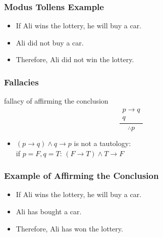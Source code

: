 \documentclass[dvipsnames]{beamer}
\begin{document}
\begin{frame}
  \frametitle{Modus Tollens Example}

  \begin{example}
    \begin{itemize}
      \item If Ali wins the lottery, he will buy a car.
      \item Ali did not buy a car.

      \pause
      \medskip
      \item Therefore, Ali did not win the lottery.
    \end{itemize}
  \end{example}
\end{frame}

\begin{frame}
  \frametitle{Fallacies}

  \begin{block}{fallacy of affirming the conclusion}
    \[
    \frac
      {
      \begin{array}{c}
        p \rightarrow q\\
        q
        \end{array}
      }
      {
        \therefore p
      }
    \]
  \end{block}

  \pause
  \begin{itemize}
    \item $(p \rightarrow q) \wedge q \rightarrow p$ is not a tautology:\\
      if $p=F,q=T$: $(F \rightarrow T) \wedge T \rightarrow F$
  \end{itemize}
\end{frame}

\begin{frame}
  \frametitle{Example of Affirming the Conclusion}

  \begin{example}
    \begin{itemize}
      \item If Ali wins the lottery, he will buy a car.
      \item Ali has bought a car.

      \pause
      \medskip
      \item Therefore, Ali has won the lottery.
    \end{itemize}
  \end{example}
\end{frame}
\end{document}

